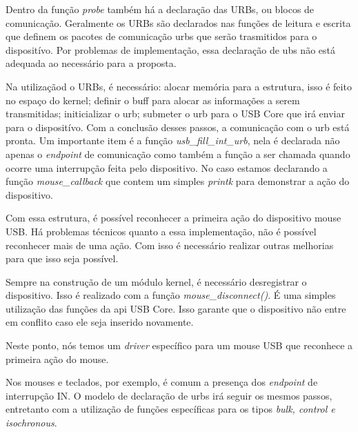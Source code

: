 \lstset{style=shell}


Dentro da função \textit{probe} também há a declaração das URBs, ou blocos de comunicação.
Geralmente os URBs são declarados nas funções de leitura e escrita
que definem os pacotes de comunicação urbs que serão trasmitidos para o dispositívo.
Por problemas de implementação, essa declaração de ubs não está adequada ao necessário
para a proposta.

\lstset{style=shell}


Na utilizaçãod o URBs, é necessário: alocar memória para a estrutura, isso é feito no
espaço do kernel; definir o buff para alocar as informações a serem transmitidas;
initicializar o urb; submeter o urb para o USB Core que irá enviar para o dispositívo.
Com a conclusão desses passos, a comunicação com o urb está pronta. Um importante item
é a função \textit{usb\_fill\_int\_urb}, nela é declarada não apenas o \textit{endpoint} de comunicação
como também a função a ser chamada quando ocorre uma interrupção feita pelo dispositivo.
No caso estamos declarando a função \textit{mouse\_callback} que contem um simples \textit{printk} para
demonstrar a ação do dispositivo.

\lstset{style=shell}


Com essa estrutura, é possível reconhecer a primeira ação do dispositivo mouse USB.
Há problemas técnicos quanto a essa implementação, não é possível reconhecer
mais de uma ação. Com isso é necessário realizar outras melhorias para que isso
seja possível.

Sempre na construção de um módulo kernel, é necessário desregistrar o dispositivo.
Isso é realizado com a função \textit{mouse\_disconnect()}. É uma simples utilização das
funções da api USB Core. Isso garante que o dispositivo não entre em conflito
caso ele seja inserido novamente.

\lstset{style=shell}


Neste ponto, nós temos um \textit{driver} específico para um mouse USB que reconhece a primeira
ação do mouse.

Nos mouses e teclados, por exemplo, é comum a presença dos \textit{endpoint} de interrupção IN.
O modelo de declaração de urbs irá seguir os mesmos passos, entretanto com a utilização
de funções específicas para os tipos \textit{bulk, control e isochronous}.

